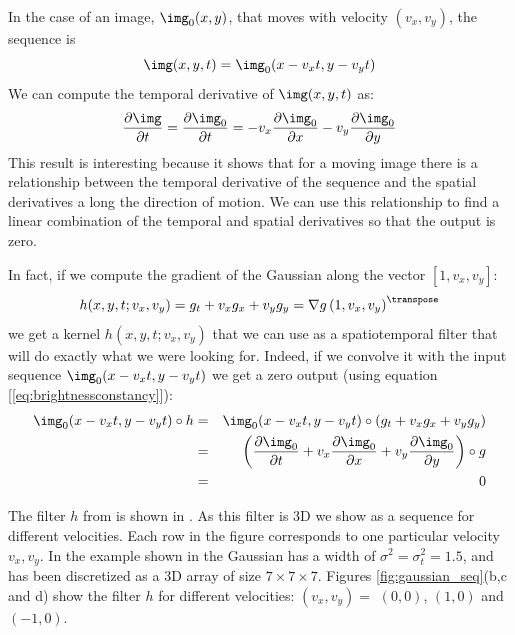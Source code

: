 In the case of an image, $\img_0 (x,y)$, that moves with velocity $(v_x, v_y)$, the sequence is 
\begin{equation}
\img (x,y,t) = \img_0 (x-v_xt,y-v_yt)
\end{equation}
We can compute the temporal derivative of $\img (x,y,t)$ as:
\begin{equation}
\frac{\partial \img}{\partial t} = \frac{\partial \img_0}{\partial t} = -v_x \frac{\partial \img_0}{\partial x} - v_y \frac{\partial \img_0}{\partial y}
\label{eq:brightnessconstancy}
\end{equation}
This result is interesting because it shows that for a moving image there is a relationship between the temporal derivative of the sequence and the spatial derivatives a long the direction of motion. We can use this relationship to find a linear combination of the temporal and spatial derivatives so that the output is zero. 

In fact, if we compute the gradient of the Gaussian along the vector $\left[1,v_x,v_y\right]$:
\begin{equation}
h(x,y,t;v_x,v_y) = g_t+v_xg_x+v_yg_y = \nabla  g \left( 1,v_x,v_y \right)^\transpose
\label{eq:spt_nulling_filter}
\end{equation}
we get a kernel $h(x,y,t;v_x,v_y)$ that we can use as a spatiotemporal filter that will do exactly what we were looking for. Indeed, if we convolve it with the input sequence $\img_0 (x-v_xt,y-v_yt)$ we get a zero output (using equation [\ref{eq:brightnessconstancy}]):
\begin{eqnarray}
\img_0 (x-v_xt,y-v_yt) \circ h &=& \img_0 (x-v_xt,y-v_yt) \circ \left(  g_t+v_xg_x+v_yg_y \right) \nonumber \\
&=& \left( \frac{\partial \img_0}{\partial t} + v_x \frac{\partial \img_0}{\partial x} + v_y \frac{\partial \img_0}{\partial y} \right) \circ g \nonumber \\
&=& 0 \nonumber
\end{eqnarray}

The filter $h$ from \eqn{\ref{eq:spt_nulling_filter}} is shown in \fig{\ref{fig:gaussian_seq}}. As this filter is 3D we show as a sequence for different velocities. Each row in the figure corresponds to one particular velocity $v_x,v_y$. In the example shown in   the Gaussian has a width of $\sigma^2=\sigma_t^2=1.5$, and has been discretized as a 3D array of size $7 \times 7 \times 7$. Figures \ref{fig:gaussian_seq}(b,c and d)  show the filter $h$ for different velocities: $(v_x,v_y) =$ $(0,0)$, $(1,0)$ and $(-1,0)$. 

